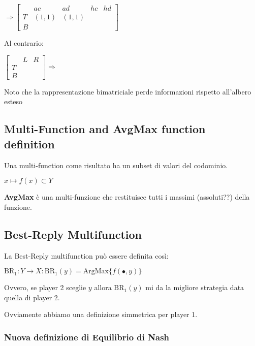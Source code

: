\documentclass[10pt,a4paper]{report}
\begin{document}
        
        $\Rightarrow
        \begin{bmatrix}
              & ac & ad & hc & hd \\
            T & (1,1) & (1,1) & & \\
            B & & & & 
        \end{bmatrix}
        $

        Al contrario:

        $
        \begin{bmatrix}
              & L & R \\
            T & & \\
            B & & 
        \end{bmatrix}
        \Rightarrow$
        

        Noto che la rappresentazione bimatriciale perde informazioni rispetto all'albero esteso

        \subsection{Multi-Function and AvgMax function definition}

        Una multi-function come risultato ha un subset di valori del codominio.

        $x \mapsto f(x) \subset Y$ 

        \textbf{AvgMax} è una multi-funzione che restituisce tutti i massimi (assoluti??) della funzione.

        \subsection{Best-Reply Multifunction}

        La Best-Reply multifunction può essere definita così:

        $\text{BR}_1: Y \rightarrow X : \text{BR}_1(y)=\text{ArgMax}\{f( \bullet , y )\}$

        Ovvero, se player 2 sceglie $y$ allora $\text{BR}_1(y)$ mi da la migliore strategia data quella di player 2.

        Ovviamente abbiamo una definizione simmetrica per player 1.
        \subsubsection{Nuova definizione di Equilibrio di Nash}
\end{document}
